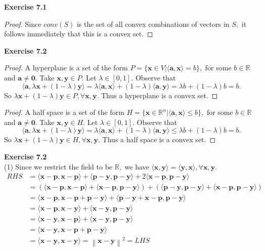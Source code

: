 \documentclass[letterpaper,12pt]{article}
\theoremstyle{definition}
\renewcommand{\vec}[1]{\mathbf{#1}}
\newcommand\norm[1]{\left\lVert#1\right\rVert}
\begin{document}
\noindent\textbf{Exercise 7.1}
\begin{proof}
  Since $conv(S)$ is the set of all convex combinations of vectors in $S,$ it follows immediately that this is a convex set.
\end{proof}

\noindent\textbf{Exercise 7.2}

\begin{proof}
  A hyperplane is a set of the form $P = \{ \vec{x} \in V | \langle\vec{a}, \vec{x}\rangle = b \},$ for some $b \in \mathbb{R}$ and $\vec{a} \neq \vec{0}.$ Take $\vec{x}, \vec{y} \in P.$ Let $\lambda \in [0,1].$ Observe that $$\langle\vec{a}, \lambda \vec{x} + (1- \lambda)\vec{y}\rangle = \lambda\langle\vec{a}, \vec{x}\rangle + (1-\lambda) \langle\vec{a}, \vec{y}\rangle = \lambda b + (1-\lambda)b = b.$$
  So $\lambda \vec{x} + (1- \lambda)\vec{y} \in P, \forall \vec{x}, \vec{y}.$ Thus a hyperplane is a convex set.
\end{proof}
\begin{proof}
  A half space is a set of the form $H = \{\vec{x} \in \mathbb{R}^n | \langle \vec{a}, \vec{x} \rangle \leq b \},$ for some $b \in \mathbb{R}$ and $\vec{a} \neq \vec{0}.$
  Take $\vec{x}, \vec{y} \in H.$ Let $\lambda \in [0,1].$ Observe that $$\langle\vec{a}, \lambda \vec{x} + (1- \lambda)\vec{y}\rangle = \lambda\langle\vec{a}, \vec{x}\rangle + (1-\lambda) \langle\vec{a}, \vec{y}\rangle \leq \lambda b + (1-\lambda)b = b.$$
  So $\lambda \vec{x} + (1- \lambda)\vec{y} \in H, \forall \vec{x}, \vec{y}.$ Thus a half space is a convex set.
\end{proof}

\noindent\textbf{Exercise 7.2} \\
(1) Since we restrict the field to be $\mathbb{R},$ we have $\langle \vec{x}, \vec{y} \rangle = \langle \vec{y}, \vec{x} \rangle, \forall \vec{x}, \vec{y}.$
\begin{align*}
  RHS &= \langle\vec{x}-\vec{p} , \vec{x}-\vec{p} \rangle  + \langle \vec{p} -\vec{y}, \vec{p} -\vec{y}\rangle +2\langle \vec{x}-\vec{p} , \vec{p} -\vec{y}\rangle \\
  &= (\langle \vec{x}-\vec{p} , \vec{x}-\vec{p} \rangle  + \langle \vec{x}-\vec{p} , \vec{p} -\vec{y}\rangle ) + ( \langle \vec{p} -\vec{y}, \vec{p} -\vec{y}\rangle +\langle \vec{x}-\vec{p} , \vec{p} -\vec{y}\rangle ) \\
  &= \langle \vec{x}-\vec{p} , \vec{x}-\vec{p} +\vec{p} -\vec{y}\rangle  + \langle \vec{p} -\vec{y}+\vec{x}-\vec{p} , \vec{p} -\vec{y}\rangle \\
  &= \langle \vec{x}-\vec{p} , \vec{x}-\vec{y}\rangle  + \langle \vec{x}-\vec{y}, \vec{p} -\vec{y}\rangle \\
  &= \langle \vec{x}-\vec{y}, \vec{x}-\vec{p} \rangle  + \langle \vec{x}-\vec{y}, \vec{p} -\vec{y}\rangle \\
  &=\langle \vec{x}-\vec{y}, \vec{x}-\vec{p} +\vec{p} -\vec{y}\rangle \\
  &=\langle\vec{x}-\vec{y}, \vec{x}-\vec{y}\rangle  = \norm{\vec{x}-\vec{y}}^2 = LHS
\end{align*}
\end{document}
